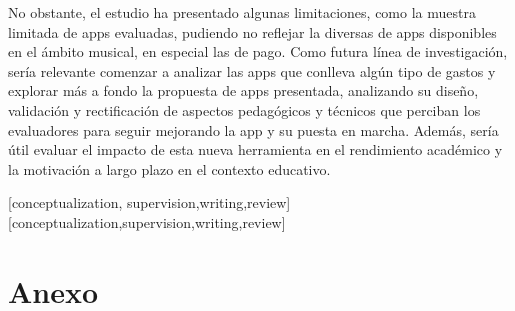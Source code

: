 \documentclass[spanish]{textolivre}
\begin{document}
No obstante, el estudio ha presentado algunas limitaciones, como la muestra limitada de apps evaluadas, pudiendo no reflejar la diversas de apps disponibles en el ámbito musical, en especial las de pago. Como futura línea de investigación, sería relevante comenzar a analizar las apps que conlleva algún tipo de gastos y explorar más a fondo la propuesta de apps presentada, analizando su diseño, validación y rectificación de aspectos pedagógicos y técnicos que perciban los evaluadores para seguir mejorando la app y su puesta en marcha. Además, sería útil evaluar el impacto de esta nueva herramienta en el rendimiento académico y la motivación a largo plazo en el contexto educativo. 


\printbibliography\label{sec-bib}


\begin{contributors}
[conceptualization, supervision,writing,review]
[conceptualization,supervision,writing,review]
\end{contributors}


\appendix 
\section{Anexo}\label{apendice}
\end{document}
